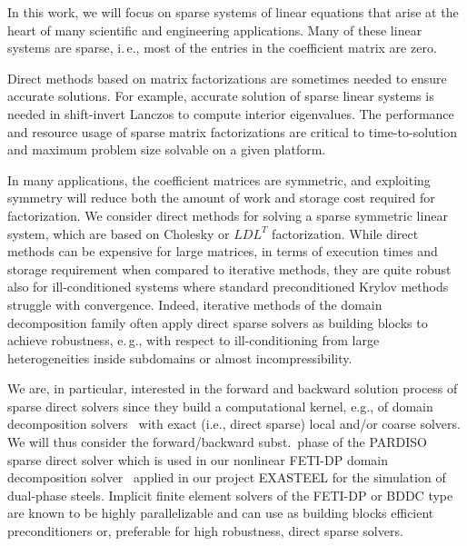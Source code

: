 In this work, we will focus on 
sparse
systems of linear equations that arise
at the heart of many scientific and engineering applications. 
Many of these linear systems are sparse, i.\,e., most of the 
entries 
in the
coefficient matrix are zero. 

Direct methods based on matrix
factorizations are sometimes needed to ensure accurate solutions. For
example, accurate solution of sparse linear systems is needed in
shift-invert Lanczos to compute interior eigenvalues. The performance
and resource usage of sparse matrix factorizations are critical to
time-to-solution and maximum problem size solvable on a given
platform.

In many applications, the coefficient matrices are
symmetric, and exploiting symmetry will reduce both the amount of work
and storage cost required for factorization. We consider direct
methods for solving a sparse symmetric linear
system, which are based on Cholesky or $LDL^T$
factorization. While direct
methods can be expensive for large matrices, in terms of execution
times and storage requirement when compared to iterative methods, they
are quite robust also for ill-conditioned systems 
where standard preconditioned Krylov methods struggle with convergence.
Indeed, iterative methods of the domain decomposition family often apply
direct sparse solvers as building blocks to achieve robustness, e.\,g., with respect 
to ill-conditioning from large heterogeneities inside subdomains or almost incompressibility.


We are, in particular, interested in the forward and backward solution
process of sparse direct solvers since they build 
a
computational
kernel, e.g., of domain decomposition solvers~\cite{toselli:2005:ddm}
with exact (i.e., direct sparse) local and/or coarse solvers. 
We will thus consider the forward/backward subst.\ phase
of the PARDISO~\cite{schenk-2004} sparse direct solver which
is used in our nonlinear FETI-DP domain decomposition
solver~\cite{klawonn:2015:tes} applied in our project EXASTEEL for the
simulation of dual-phase steels.
Implicit finite element solvers of the FETI-DP or BDDC type are known to be highly
parallelizable and can use as building blocks efficient preconditioners
or, preferable for high robustness, direct sparse solvers.


